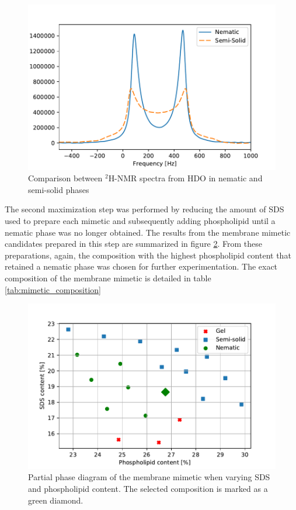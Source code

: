 \documentclass[twoside,twocolumn,9pt]{article}
\begin{document}
\begin{figure}[h]
\centering
  \includegraphics[width=\columnwidth]{nematic_v_semisolid}
  \caption{Comparison between $^2$H-NMR spectra from HDO in nematic and
    semi-solid phases}
  \label{fig:22v23}
\end{figure}

The second maximization step was performed by reducing the amount of SDS used to
prepare each mimetic and subsequently adding phospholipid until a nematic phase
was no longer obtained. The results from the membrane mimetic candidates
prepared in this step are summarized in figure \ref{fig:phase_diag}. From these
preparations, again, the composition with the highest phospholipid content that
retained a nematic phase was chosen for further experimentation. The exact
composition of the membrane mimetic is detailed in table \ref{tab:mimetic_composition}

\begin{figure}[h]
\centering
  \includegraphics[width=\columnwidth]{phase_diag}
  \caption{Partial phase diagram of the membrane mimetic when varying SDS and
    phospholipid content. The selected composition is marked as a green diamond.}
  \label{fig:phase_diag}
\end{figure}
\end{document}
